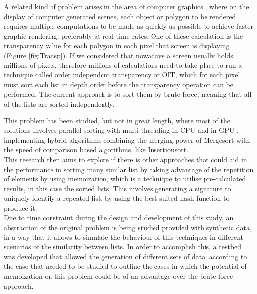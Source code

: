 \documentclass[a4paper,12pt]{article}
\begin{document}
A related kind of problem arises in the area of computer graphics \cite{Arch2015}, where on the display of computer generated scenes, each object or polygon to be rendered requires multiple computations to be made as quickly as possible to achieve faster graphic rendering, preferably at real time rates. One of these calculation is the transparency value for each polygon in each pixel that screen is displaying (Figure \ref{fig:Transp}). If we considered that nowadays a screen usually holds millions of pixels, therefore millions of calculations need to take place to run a technique called order independent transparency or OIT, which for each pixel must sort each list in depth order before the transparency operation can be performed. The current approach is to sort them by brute force, meaning that all of the lists are sorted independently.

This problem has been studied, but not in great length, where most of the solutions involves parallel sorting with multi-threading in CPU \cite{han2002integer} and in GPU \cite{hou2017fast},  implementing hybrid algorithms combining the merging power of Mergesort with the speed of comparison based algorithms, like Insertionsort. 
\\

This research then aims to explore if there is other approaches that could aid in the performance in sorting many similar list by taking advantage of the repetition of elements by using memoization, which is a technique to utilise pre-calculated results, in this case the sorted lists. This involves generating a signature to uniquely identify a repeated list, by using the best suited hash function to produce it.
\\

Due to time constraint during the design and development of this study, an abstraction of the original problem is being studied provided with synthetic data, in a way that it allows to simulate the behaviour of this techniques in different scenarios of the similarity between lists. In order to accomplish this, a testbed was developed that allowed the generation of different sets of data, according to the case that needed to be studied to outline the cases in which the potential of memoization on this problem could be of an advantage over the brute force approach.
\end{document}
